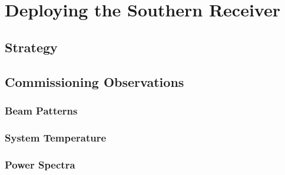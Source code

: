 \chapter{Deploying the Southern Receiver}

\section{Strategy}
  

\section{Commissioning Observations}
  \subsection{Beam Patterns}
  \subsection{System Temperature}
  \subsection{Power Spectra}
  


